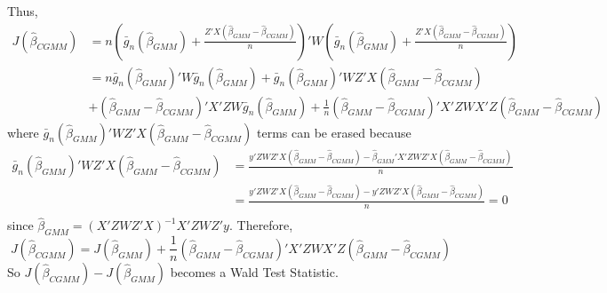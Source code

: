  Thus,
 \small{\[
 \begin{aligned}
 J(\hat{\beta}_{CGMM})&=n\left(\bar{g}_n(\hat{\beta}_{GMM})+\frac{Z'X(\hat{\beta}_{GMM}-\hat{\beta}_{CGMM})}{n}\right)'W\left(\bar{g}_n(\hat{\beta}_{GMM})+\frac{Z'X(\hat{\beta}_{GMM}-\hat{\beta}_{CGMM})}{n}\right)\\
 &=n\bar{g}_n(\hat{\beta}_{GMM})'W\bar{g}_n(\hat{\beta}_{GMM})+\bar{g}_n(\hat{\beta}_{GMM})'WZ'X(\hat{\beta}_{GMM}-\hat{\beta}_{CGMM})\\
 &+(\hat{\beta}_{GMM}-\hat{\beta}_{CGMM})'X'ZW\bar{g}_n(\hat{\beta}_{GMM})+\frac{1}{n}(\hat{\beta}_{GMM}-\hat{\beta}_{CGMM})'X'ZWX'Z(\hat{\beta}_{GMM}-\hat{\beta}_{CGMM})
 \end{aligned}
 \]}\normalsize
 where $\bar{g}_n(\hat{\beta}_{GMM})'WZ'X(\hat{\beta}_{GMM}-\hat{\beta}_{CGMM})$ terms can be erased because
 \footnotesize{\[
 \begin{aligned}
 \bar{g}_n(\hat{\beta}_{GMM})'WZ'X(\hat{\beta}_{GMM}-\hat{\beta}_{CGMM})&=\frac{y'ZWZ'X(\hat{\beta}_{GMM}-\hat{\beta}_{CGMM})-\hat{\beta}_{GMM}'X'ZWZ'X(\hat{\beta}_{GMM}-\hat{\beta}_{CGMM})}{n}\\
 &=\frac{y'ZWZ'X(\hat{\beta}_{GMM}-\hat{\beta}_{CGMM})-y'ZWZ'X(\hat{\beta}_{GMM}-\hat{\beta}_{CGMM})}{n}=0\\\
 \end{aligned}
 \]}\normalsize
since $\hat{\beta}_{GMM}=(X'ZWZ'X)^{-1}X'ZWZ'y$. Therefore, 
\[
J(\hat{\beta}_{CGMM})=J(\hat{\beta}_{GMM})+\frac{1}{n}(\hat{\beta}_{GMM}-\hat{\beta}_{CGMM})'X'ZWX'Z(\hat{\beta}_{GMM}-\hat{\beta}_{CGMM})
\]
So $J(\hat{\beta}_{CGMM})- J(\hat{\beta}_{GMM})$ becomes a Wald Test Statistic.
